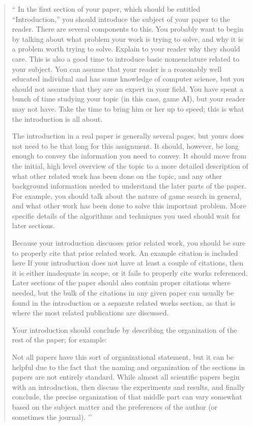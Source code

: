 \documentclass[12pt,letterpaper]{article}
\begin{document}
\begin{quote}
`` 
In the first section of your paper, which should be entitled ``Introduction,''
you should introduce the subject of your paper to the reader.  There are several
components to this.  You probably want to begin by talking about what problem
your work is trying to solve, and why it is a problem worth trying to solve.
Explain to your reader why they should care.  This is also a good time to
introduce basic nomenclature related to your subject.  You can assume that your
reader is a reasonably well educated individual and has some knowledge of
computer science, but you should not assume that they are an expert in your field.  You have
spent a bunch of time studying your topic (in this case, game AI), but
your reader may not have.  Take the time to bring him or her up to speed; this
is what the introduction is all about.

The introduction in a real paper is generally several pages, but yours does not
need to be that long for this assignment.  It should, however, be long enough to
convey the information you need to convey.  It should move from the initial, high level
overview of the topic to a more detailed description of what other related work
has been done on the topic, and any other background information needed to
understand the later parts of the paper.  For example, you should talk about the nature
of game search in general, and what other work has been
done to solve this important problem.  More specific details of the algorithms and
techniques you used should wait for later sections.

Because your introduction discusses prior related work, you should be sure to
properly cite that prior related work. An example citation is included here
If your introduction does not have at
least a couple of citations, then it is either inadequate in scope, or it fails
to properly cite works referenced.  Later sections of the
paper should also contain proper citations where needed, but the bulk of the
citations in any given paper can usually be found in the introduction or a 
separate related works section, as that
is where the most related publications are discussed.

Your introduction should conclude by describing the organization of the rest of
the paper; for example:

Not all papers have this sort of organizational statement, but it can be helpful
due to the fact that the naming and organization of the sections in papers are
not entirely standard.  While almost all scientific papers begin with an
introduction, then discuss the experiments and results, and finally conclude,
the precise organization of that middle part can vary somewhat based on the
subject matter and the preferences of the author (or sometimes the journal).
’’
\end{quote}
\end{document}
